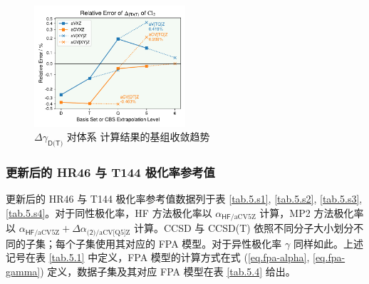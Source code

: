 \begin{figure}[ht]
    \centering
    \caption{$\Delta \gamma_\textsf{D(T)}$ 对体系  计算结果的基组收敛趋势}
    \label{fig.Cl2-aniso}
    \includegraphics[width=0.5\textwidth]{assets/Cl2-aniso.pdf}
\end{figure}

\newpage

\subsubsection{更新后的 HR46 与 T144 极化率参考值}

更新后的 HR46 与 T144 极化率参考值数据列于表 \ref{tab.5.s1}, \ref{tab.5.s2}, \ref{tab.5.s3}, \ref{tab.5.s4}。对于同性极化率，HF 方法极化率以 $\alpha_{\textsf{HF}/\text{aCV5Z}}$ 计算，MP2 方法极化率以 $\alpha_{\textsf{HF}/\text{aCV5Z}} + \Delta \alpha_{\textsf{(2)}/\text{aCV[Q5]Z}}$ 计算。CCSD 与 CCSD(T) 依照不同分子大小划分不同的子集；每个子集使用其对应的 FPA 模型。对于异性极化率 $\gamma$ 同样如此。上述记号在表 \ref{tab.5.1} 中定义，FPA 模型的计算方式在式 (\ref{eq.fpa-alpha}, \ref{eq.fpa-gamma}) 定义，数据子集及其对应 FPA 模型在表 \ref{tab.5.4} 给出。

